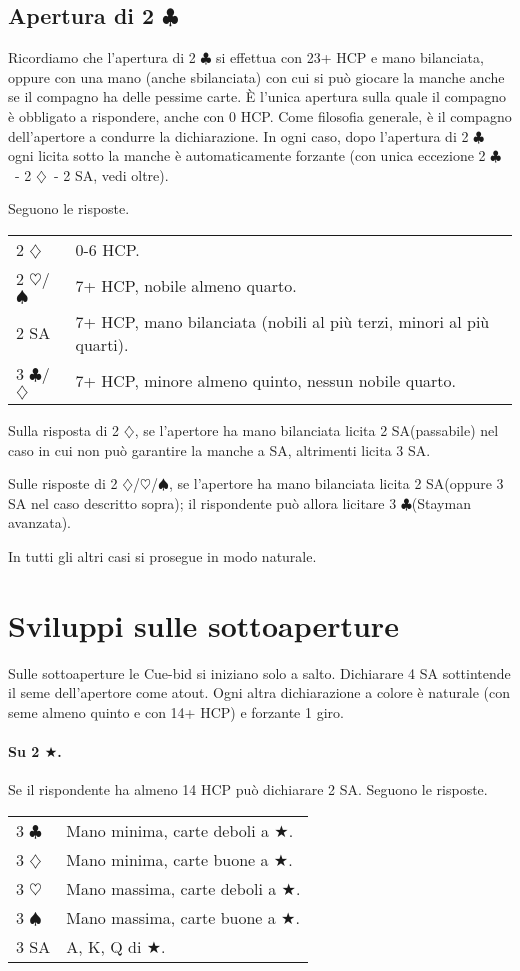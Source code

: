 \documentclass[a4paper,10pt]{article}
\renewcommand{\c}{$\clubsuit$\xspace}
\renewcommand{\d}{$\diamondsuit$\xspace}
\newcommand{\h}{$\heartsuit$\xspace}
\newcommand{\s}{$\spadesuit$\xspace}
\renewcommand{\j}{$\bigstar$\xspace}
\newcommand{\sa}{SA\xspace}
\newcommand{\smallspace}{\vskip0.3cm}
\newenvironment{twocol}
  {\smallspace\noindent\begin{tabular}{l p{0.78\textwidth}}}
  {\end{tabular}\smallspace}
\begin{document}
\subsection{Apertura di 2 \c}

Ricordiamo che l'apertura di 2 \c si effettua con 23+ HCP e mano bilanciata, oppure con una mano (anche sbilanciata) con cui si può giocare la manche anche se il compagno ha delle pessime carte.
È l'unica apertura sulla quale il compagno è obbligato a rispondere, anche con 0 HCP.
Come filosofia generale, è il compagno dell'apertore a condurre la dichiarazione.
In ogni caso, dopo l'apertura di 2 \c ogni licita sotto la manche è automaticamente forzante (con unica eccezione 2 \c\ - 2 \d\ - 2 \sa, vedi oltre).

Seguono le risposte.
\begin{twocol}
  2 \d & 0-6 HCP.\\
  2 \h/\s & 7+ HCP, nobile almeno quarto.\\
  2 \sa & 7+ HCP, mano bilanciata (nobili al più terzi, minori al più quarti).\\
  3 \c/\d & 7+ HCP, minore almeno quinto, nessun nobile quarto.\\
\end{twocol}

Sulla risposta di 2 \d, se l'apertore ha mano bilanciata licita 2 \sa (passabile) nel caso in cui non può garantire la manche a \sa, altrimenti licita 3 \sa.

Sulle risposte di 2 \d/\h/\s, se l'apertore ha mano bilanciata licita 2 \sa (oppure 3 \sa nel caso descritto sopra); il rispondente può allora licitare 3 \c (Stayman avanzata).

In tutti gli altri casi si prosegue in modo naturale.


\pagebreak

\section{Sviluppi sulle sottoaperture}

Sulle sottoaperture le Cue-bid si iniziano solo a salto. Dichiarare 4 \sa sottintende il seme dell'apertore come atout. Ogni altra dichiarazione a colore è naturale (con seme almeno quinto e con 14+ HCP) e forzante 1 giro.

\paragraph{Su 2 \j.} Se il rispondente ha almeno 14 HCP può dichiarare 2 \sa. Seguono le risposte.
\begin{twocol}
 3 \c & Mano minima, carte deboli a \j.\\
 3 \d & Mano minima, carte buone a \j.\\
 3 \h & Mano massima, carte deboli a \j.\\
 3 \s & Mano massima, carte buone a \j.\\
 3 \sa & A, K, Q di \j.
\end{twocol}
\end{document}
